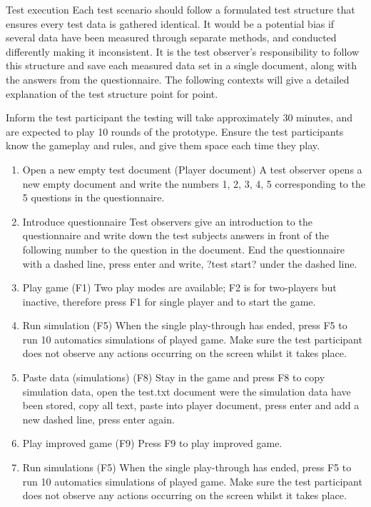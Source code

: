 Test execution
Each test scenario should follow a formulated test structure that ensures every test data is gathered identical. It would be a potential bias if several data have been measured through separate methods, and conducted differently making it inconsistent. It is the test observer's responsibility to follow this structure and save each measured data set in a single document, along with the answers from the questionnaire.
The following contexts will give a detailed explanation of the test structure point for point.  

Inform the test participant the testing will take approximately 30 minutes, and are expected to play 10 rounds of the prototype. Ensure the test participants know the gameplay and rules, and give them space each time they play. 

\begin{enumerate}
\item	Open a new empty test document (Player document)
A test observer opens a new empty document and write the numbers 1, 2, 3, 4, 5 corresponding to the 5 questions in the questionnaire.

\item Introduce questionnaire
Test observers give an introduction to the questionnaire and write down the test subjects answers in front of the following number to the question in the document. 
End the questionnaire with a dashed line, press enter and write, ?test start? under the dashed line.

\item Play game (F1)
Two play modes are available; F2 is for two-players but inactive, therefore press F1 for single player and to start the game.

\item Run simulation (F5)
When the single play-through has ended, press F5 to run 10 automatics simulations of played game. Make sure the test participant does not observe any actions occurring on the screen whilst it takes place. 

\item Paste data (simulations) (F8)
Stay in the game and press F8 to copy simulation data, open the test.txt document were the simulation data have been stored, copy all text, paste into player document, press enter and add a new dashed line, press enter again. 

\item Play improved game (F9)
Press F9 to play improved game. 

\item Run simulations (F5)
When the single play-through has ended, press F5 to run 10 automatics simulations of played game. Make sure the test participant does not observe any actions occurring on the screen whilst it takes place.


\end{enumerate}

